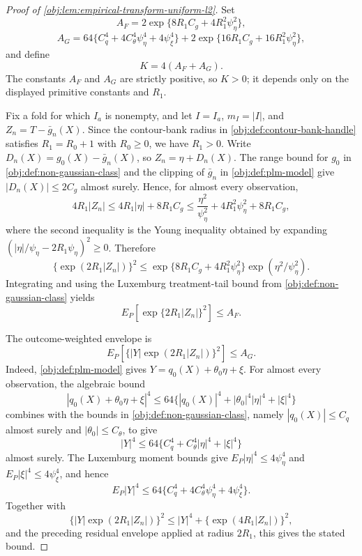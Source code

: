 \documentclass[11pt]{article}
\begin{document}
\begin{proof}[Proof of \cref{obj:lem:empirical-transform-uniform-l2}]
Set
\[
A_F=2\exp\{8R_1C_g+4R_1^2\psi_\eta^2\},
\]
\[
A_G=
64\{C_q^4+4C_\theta^4\psi_\eta^4+4\psi_\xi^4\}
+
2\exp\{16R_1C_g+16R_1^2\psi_\eta^2\},
\]
and define
\[
K=4(A_F+A_G).
\]
The constants \(A_F\) and \(A_G\) are strictly positive, so \(K>0\); it
depends only on the displayed primitive constants and \(R_1\). %

Fix a fold for which \(I_a\) is nonempty, and let \(I=I_a\),
\(m_I=|I|\), and \(Z_n=T-\bar g_n(X)\). Since the contour-bank radius in
\cref{obj:def:contour-bank-handle} satisfies \(R_1=R_0+1\) with
\(R_0\ge0\), we have \(R_1>0\). Write
\(D_n(X)=g_0(X)-\bar g_n(X)\), so \(Z_n=\eta+D_n(X)\). The range bound for
\(g_0\) in \cref{obj:def:non-gaussian-class} and the clipping of
\(\bar g_n\) in \cref{obj:def:plm-model} give \(|D_n(X)|\le 2C_g\) almost
surely. Hence, for almost every observation,
\[
4R_1|Z_n|
\le 4R_1|\eta|+8R_1C_g
\le \frac{\eta^2}{\psi_\eta^2}+4R_1^2\psi_\eta^2+8R_1C_g,
\]
where the second inequality is the Young inequality obtained by expanding
\((|\eta|/\psi_\eta-2R_1\psi_\eta)^2\ge0\). Therefore
\[
\{\exp(2R_1|Z_n|)\}^2
\le
\exp\{8R_1C_g+4R_1^2\psi_\eta^2\}
\exp(\eta^2/\psi_\eta^2).
\]
Integrating and using the Luxemburg treatment-tail bound from
\cref{obj:def:non-gaussian-class} yields
\[
E_P\left[\exp\{2R_1|Z_n|\}^2\right]
\le A_F.
\]

The outcome-weighted envelope is
\[
E_P\left[\{|Y|\exp(2R_1|Z_n|)\}^2\right]\le A_G.
\]
Indeed, \cref{obj:def:plm-model} gives \(Y=q_0(X)+\theta_0\eta+\xi\). For
almost every observation, the algebraic bound
\[
|q_0(X)+\theta_0\eta+\xi|^4
\le
64\{|q_0(X)|^4+|\theta_0|^4|\eta|^4+|\xi|^4\}
\]
combines with the bounds in \cref{obj:def:non-gaussian-class}, namely
\(|q_0(X)|\le C_q\) almost surely and \(|\theta_0|\le C_\theta\), to give
\[
|Y|^4
\le
64\{C_q^4+C_\theta^4|\eta|^4+|\xi|^4\}
\]
almost surely. The Luxemburg moment bounds give
\(E_P|\eta|^4\le4\psi_\eta^4\) and \(E_P|\xi|^4\le4\psi_\xi^4\), and hence
\[
E_P|Y|^4
\le
64\{C_q^4+4C_\theta^4\psi_\eta^4+4\psi_\xi^4\}.
\]
Together with
\[
\{|Y|\exp(2R_1|Z_n|)\}^2
\le
|Y|^4+
\{\exp(4R_1|Z_n|)\}^2,
\]
and the preceding residual envelope applied at radius \(2R_1\), this gives the
stated bound. %


\end{proof}
\end{document}
